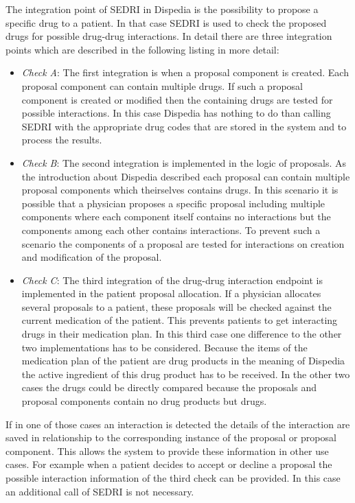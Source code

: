 The integration point of SEDRI in Dispedia is the possibility to propose a specific drug to a patient.
In that case SEDRI is used to check the proposed drugs for possible drug-drug interactions.
In detail there are three integration points which are described in the following listing in more detail: 
\begin{itemize}
\item \textit{Check A}: The first integration is when a proposal component is created.
Each proposal component can contain multiple drugs.
If such a proposal component is created or modified then the containing drugs are tested for possible interactions.
In this case Dispedia has nothing to do than calling SEDRI with the appropriate drug codes that are stored in the system and to process the results.
\item \textit{Check B}: The second integration is implemented in the logic of proposals.
As the introduction about Dispedia described each proposal can contain multiple proposal components which theirselves contains drugs.
In this scenario it is possible that a physician proposes a specific proposal including multiple components where each component itself contains no interactions but the components among each other contains interactions.
To prevent such a scenario the components of a proposal are tested for interactions on creation and modification of the proposal.
\item \textit{Check C}: The third integration of the drug-drug interaction endpoint is implemented in the patient proposal allocation.
If a physician allocates several proposals to a patient, these proposals will be checked against the current medication of the patient.
This prevents patients to get interacting drugs in their medication plan.
In this third case one difference to the other two implementations has to be considered.
Because the items of the medication plan of the patient are drug products in the meaning of Dispedia the active ingredient of this drug product has to be received.
In the other two cases the drugs could be directly compared because the proposals and proposal components contain no drug products but drugs.
\end{itemize}
If in one of those cases an interaction is detected the details of the interaction are saved in relationship to the corresponding instance of the proposal or proposal component.
This allows the system to provide these information in other use cases.
For example when a patient decides to accept or decline a proposal the possible interaction information of the third check can be provided.
In this case an additional call of SEDRI is not necessary.


